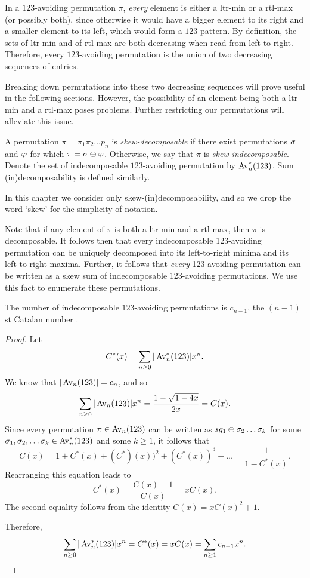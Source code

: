     In a $123$-avoiding permutation $\pi$, \emph{every} element is either a
    ltr-min or a rtl-max (or possibly both), since otherwise it would have a bigger
    element to its right and a smaller element to its left, which would form a
    $123$ pattern. By definition, the sets of ltr-min and of rtl-max are both
    decreasing when read from left to right. Therefore, every $123$-avoiding
    permutation is the union of two decreasing sequences of entries. 

    Breaking down permutations into these two decreasing sequences will prove
    useful in the following sections. However, the possibility of an element
    being both a ltr-min and a rtl-max poses problems. Further restricting our
    permutations will alleviate this issue. 

    \begin{definition} \label{def:indecomposable}
      A permutation $\pi = \pi_1 \pi_2 \dots p_n$ is \emph{skew-decomposable}  if
      there exist permutations $\sigma$ and $\varphi$ for which $\pi = \sigma \ominus \varphi$.
      Otherwise, we say that $\pi$ is \emph{skew-indecomposable}.  Denote the set of
      indecomposable $123$-avoiding permutation by $\operatorname{{Av}}_n^*(123)$. 
      Sum (in)decomposability is defined similarly. 
    \end{definition}
    
    In this chapter we consider only
    skew-(in)decomposability, and so we drop the word `skew' for the simplicity
    of notation. 


    Note that if any element of $\pi$ is both a ltr-min and a rtl-max, then $\pi$
    is decomposable. It follows then that every indecomposable 123-avoiding
    permutation can be uniquely decomposed into its left-to-right minima and its
    left-to-right maxima. Further, it follows that \emph{every} 123-avoiding
    permutation can be written as a skew sum of indecomposable 123-avoiding
    permutations. We use this fact to enumerate these permutations.


    \begin{proposition} \label{expat:prop:indecomposable}

      The number of indecomposable $123$-avoiding permutations is $c_{n-1}$, the
      $(n-1)$st Catalan number .
    \end{proposition}
    \begin{proof}
      Let 
      $$ C^*(x) = \sum_{n \geq 0} |\operatorname{{Av}}_n^*(123)| x^n.$$
      We know that $|\operatorname{{Av}}_n(123)| = c_n$, and so 
      $$ \sum_{n \geq 0} |\operatorname{{Av}}_n(123)| x^n = \frac{1 - \sqrt{1-4x}}{2x} = C(x).$$
      Since every permutation $\pi \in \operatorname{{Av}}_n(123)$ can be written as $sg_1 \ominus \sigma_2
      \dots \sigma_k$ for some $\sigma_1, \sigma_2, \dots \sigma_k \in \operatorname{{Av}}_n^*(123)$ and some $k
      \geq 1$, it follows that 
      $$ C(x) = 1 + C^*(x) + (C^*)(x))^2 + (C^*(x))^3 + \dots 
        = \frac{1}{1 - C^*(x)}.$$
      Rearranging this equation leads to 
      $$ C^*(x) = \frac{C(x) - 1}{C(x)} = xC(x).$$
      The second equality follows from the identity $C(x) = xC(x)^2 + 1$. 

      Therefore, 
      $$ \sum_{n \geq 0} |\operatorname{{Av}}_n^*(123)|x^n = C^*(x) = xC(x) = \sum_{n \geq 1}
      c_{n-1}x^n.$$
    \end{proof}
      


